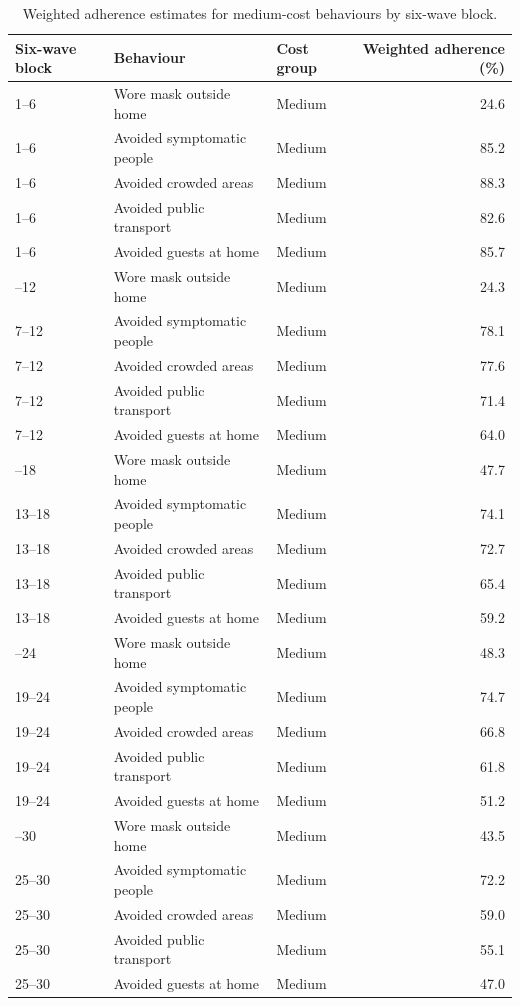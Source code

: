 \documentclass[
  12pt,
  a4paper,
]{article}
\begin{document}
\begin{longtable}[t]{lllr}
\caption{\label{tab:medium-trends-appendix}Weighted adherence estimates for medium-cost behaviours by six-wave block.}\\
\toprule
Six-wave block & Behaviour & Cost group & Weighted adherence (\%)\\
\midrule
1--6 & Wore mask outside home & Medium & 24.6\\
1--6 & Avoided symptomatic people & Medium & 85.2\\
1--6 & Avoided crowded areas & Medium & 88.3\\
1--6 & Avoided public transport & Medium & 82.6\\
1--6 & Avoided guests at home & Medium & 85.7\\
\addlinespace
7--12 & Wore mask outside home & Medium & 24.3\\
7--12 & Avoided symptomatic people & Medium & 78.1\\
7--12 & Avoided crowded areas & Medium & 77.6\\
7--12 & Avoided public transport & Medium & 71.4\\
7--12 & Avoided guests at home & Medium & 64.0\\
\addlinespace
13--18 & Wore mask outside home & Medium & 47.7\\
13--18 & Avoided symptomatic people & Medium & 74.1\\
13--18 & Avoided crowded areas & Medium & 72.7\\
13--18 & Avoided public transport & Medium & 65.4\\
13--18 & Avoided guests at home & Medium & 59.2\\
\addlinespace
19--24 & Wore mask outside home & Medium & 48.3\\
19--24 & Avoided symptomatic people & Medium & 74.7\\
19--24 & Avoided crowded areas & Medium & 66.8\\
19--24 & Avoided public transport & Medium & 61.8\\
19--24 & Avoided guests at home & Medium & 51.2\\
\addlinespace
25--30 & Wore mask outside home & Medium & 43.5\\
25--30 & Avoided symptomatic people & Medium & 72.2\\
25--30 & Avoided crowded areas & Medium & 59.0\\
25--30 & Avoided public transport & Medium & 55.1\\
25--30 & Avoided guests at home & Medium & 47.0\\

\end{longtable}
\end{document}
